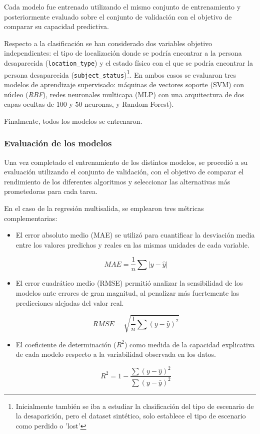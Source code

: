 Cada modelo fue entrenado utilizando el mismo conjunto de entrenamiento y posteriormente evaluado sobre el conjunto de validación con el objetivo de comparar su capacidad predictiva.

Respecto a la clasificación se han considerado dos variables objetivo independientes: el tipo de localización donde se podría encontrar a la persona desaparecida (\texttt{location\_type}) y el estado físico con el que se podría encontrar la persona desaparecida (\texttt{subject\_status})\footnote{Inicialmente también se iba a estudiar la clasificación del tipo de escenario de la desaparición, pero el dataset sintético, solo establece el tipo de escenario como perdido o 'lost'}. En ambos casos se evaluaron tres modelos de aprendizaje supervisado: máquinas de vectores soporte (SVM) con núcleo (\textit{RBF}), redes neuronales multicapa (MLP) con una arquitectura de dos capas ocultas de 100 y 50 neuronas, y Random Forest).

Finalmente, todos los modelos se entrenaron. 

\subsubsection{Evaluación de los modelos}
Una vez completado el entrenamiento de los distintos modelos, se procedió a su evaluación utilizando el conjunto de validación, con el objetivo de comparar el rendimiento de los diferentes algoritmos y seleccionar las alternativas más prometedoras para cada tarea.

En el caso de la regresión multisalida, se emplearon tres métricas complementarias\cite{sklearn_metrics}:
\begin{itemize}
    \item El error absoluto medio (MAE) se utilizó para cuantificar la desviación media entre los valores predichos y reales en las mismas unidades de cada variable.

    $$MAE=\frac1n \sum |y-\hat y|$$

    \item El error cuadrático medio (RMSE) permitió analizar la sensibilidad de los modelos ante errores de gran magnitud, al penalizar más fuertemente las predicciones alejadas del valor real.

    $$RMSE=\sqrt{\frac1n\sum(y-\hat y)^2}$$

    \item El coeficiente de determinación ($R^2$) como medida de la capacidad explicativa de cada modelo respecto a la variabilidad observada en los datos.

    $$R^2 = 1 - \frac{\sum (y - \hat{y})^2}{\sum (y - \bar{y})^2}$$

\end{itemize}

